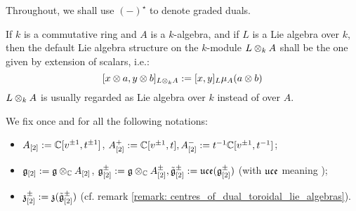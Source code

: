         \begin{convention}
            Throughout, we shall use $(-)^{\star}$ to denote graded duals. 
        \end{convention}

        \begin{convention}
            If $k$ is a commutative ring and $A$ is a $k$-algebra, and if $L$ is a Lie algebra over $k$, then the default Lie algebra structure on the $k$-module $L \tensor_k A$ shall be the one given by extension of scalars, i.e.:
                $$[x \tensor a, y \tensor b]_{L \tensor_k A} := [x, y]_L \mu_A(a \tensor b)$$
            $L \tensor_k A$ is usually regarded as Lie algebra over $k$ instead of over $A$.  
        \end{convention}

        \begin{convention} \label{conv: multiloop_algebras}
            We fix once and for all the following notations:
            \begin{itemize}
                \item $A_{[2]} := \mathbb{C}[v^{\pm 1}, t^{\pm 1}]$, $A_{[2]}^+ := \mathbb{C}[v^{\pm 1}, t], A_{[2]}^- := t^{-1}\mathbb{C}[v^{\pm 1}, t^{-1}]$;
                \item $\g_{[2]} := \g \tensor_{\bbC} A_{[2]}$, $\g_{[2]}^{\pm} := \g \tensor_{\bbC} A_{[2]}^{\pm}, \tilde{\g}_{[2]}^{\pm} := \uce(\g_{[2]}^{\pm})$ (with $\mathfrak{uce}$ meaning );
                \item $\mathfrak{z}_{[2]}^{\pm} := \mathfrak{z}(\tilde{\mathfrak{g}}_{[2]}^{\pm})$ (cf. remark \ref{remark: centres_of_dual_toroidal_lie_algebras}).
            \end{itemize}
        \end{convention}
    
